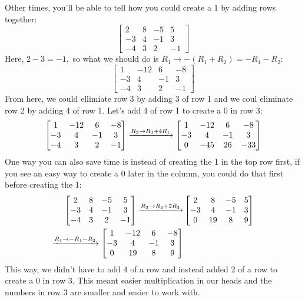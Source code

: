 \documentclass[12pt]{scrartcl}
\begin{document}
    Other times, you'll be able to tell how you could create a 1 by adding rows together:
    \[
        \begin{bmatrix}
            2 & 8 & -5 & 5 \\
            -3 & 4 & -1 & 3 \\
            -4 & 3 & 2 & -1
        \end{bmatrix}
    \]
    Here, $2 - 3 = -1,$ so what we should do is $R_1 \to -(R_1 + R_2) = -R_1 - R_2$:
    \[
        \begin{bmatrix}
            1 & -12  & 6 & -8 \\
            -3 & 4 & -1 & 3 \\
            -4 & 3 & 2 & -1
        \end{bmatrix}
    \]
    From here, we could ellimiate row 3 by adding 3 of row 1 and we coul eliminate row 2 by adding 4 of row 1. Let's add 4 of row 1 to create a 0 in row 3:
    \[
        \begin{bmatrix}
            1 & -12  & 6 & -8 \\
            -3 & 4 & -1 & 3 \\
            -4 & 3 & 2 & -1
        \end{bmatrix}
        \xto[R_3 \to R_3 + 4R_1]
        \begin{bmatrix}
            1 & -12  & 6 & -8 \\
            -3 & 4 & -1 & 3 \\
            0 & -45 & 26 & -33 
        \end{bmatrix}
    \]
    One way you can also save time is instead of creating the 1 in the top row first, if you see an easy way to create a 0 later in the column, you could do that first before creating the 1:
    \begin{align*}
        \begin{bmatrix}
            2 & 8 & -5 & 5 \\
            -3 & 4 & -1 & 3 \\
            -4 & 3 & 2 & -1
        \end{bmatrix}
        \xto[R_3 \to R_3 + 2R_3]&
        \begin{bmatrix}
            2 & 8 & -5 & 5 \\
            -3 & 4 & -1 & 3 \\
            0 & 19 & 8 & 9
        \end{bmatrix} \\
        \xto[R_1 \to -R_1 - R_2]
        \begin{bmatrix}
            1 & -12 & 6 & -8 \\
            -3 & 4 & -1 & 3 \\
            0 & 19 & 8 & 9
        \end{bmatrix}
    \end{align*}
    This way, we didn't have to add 4 of a row and instead added 2 of a row to create a 0 in row 3. This meant easier multiplication in our heads and the numbers in row 3 are smaller and easier to work with.
\end{document}
